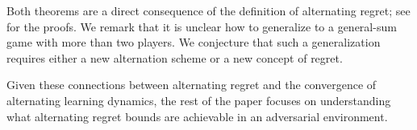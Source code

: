 Both theorems are a direct consequence of the definition of alternating regret; see  for the proofs.
We remark that it is unclear how to generalize  to a general-sum game with more than two players.
We conjecture that such a generalization requires either a new alternation scheme or a new concept of regret.

Given these connections between alternating regret and the convergence of alternating learning dynamics, the rest of the paper focuses on understanding what alternating regret bounds are achievable in an adversarial environment.
